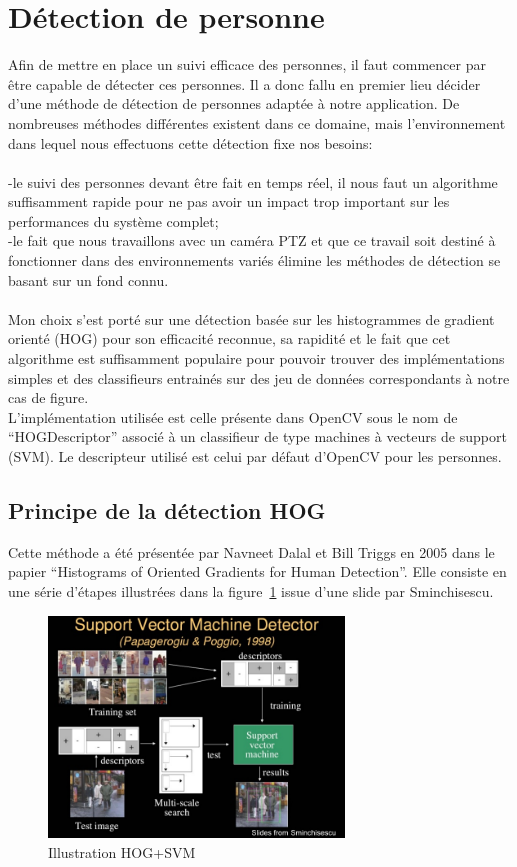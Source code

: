 \documentclass[12pt]{article}
\begin{document}
\section{Détection de personne}
Afin de mettre en place un suivi efficace des personnes, il faut commencer par être capable de détecter ces personnes. Il a donc fallu en premier lieu décider d'une méthode de détection de personnes adaptée à notre application. De nombreuses méthodes différentes existent dans ce domaine, mais l'environnement dans lequel nous effectuons cette détection fixe nos besoins:\\
\\
-le suivi des personnes devant être fait en temps réel, il nous faut un algorithme suffisamment rapide pour ne pas avoir un impact trop important sur les performances du système complet;\\
-le fait que nous travaillons avec un caméra PTZ et que ce travail soit destiné à fonctionner dans des environnements variés élimine les méthodes de détection se basant sur un fond connu.\\
\\
Mon choix s'est porté sur une détection basée sur les histogrammes de gradient orienté (HOG) pour son efficacité reconnue, sa rapidité et le fait que cet algorithme est suffisamment populaire pour pouvoir trouver des implémentations simples et des classifieurs entrainés sur des jeu de données correspondants à notre cas de figure.\\
L’implémentation utilisée est celle présente dans OpenCV sous le nom de ``HOGDescriptor'' associé à un classifieur de type machines à vecteurs de support (SVM). Le descripteur utilisé est celui par défaut d'OpenCV pour les personnes.
\subsection{Principe de la détection HOG}
Cette méthode a été présentée par Navneet Dalal et Bill Triggs en 2005 dans le papier ``Histograms of Oriented Gradients for Human Detection''.
Elle consiste en une série d'étapes illustrées dans la figure~\ref{fig:hog_topo} issue d'une slide par Sminchisescu.
\begin{figure}[!ht]
    \centering
	    \includegraphics[clip=true,trim= 10 0 80 80,width=0.7\textwidth]{img/hog_svm.jpg}
	    \caption{Illustration HOG+SVM}
   	    \label{fig:hog_topo}
\end{figure}
\end{document}
